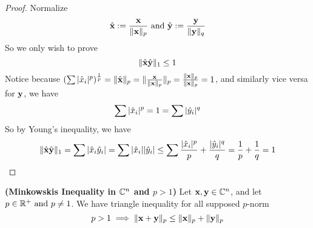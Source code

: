 \documentclass{report}
\begin{document}
\begin{proof}
Normalize 
\begin{equation}
\hat{\textbf{x}}:= \frac{\textbf{x}}{\| \textbf{x} \|_p}\text{ and }\hat{\textbf{y}}:=\frac{\textbf{y}}{\| \textbf{y} \|_q}
\end{equation}
So we only wish to prove
\begin{equation}
\| \hat{\textbf{x}}\hat{\textbf{y}} \|_1\leq 1 
\end{equation}
Notice because $(\sum |\hat{x}_i|^p)^{\frac{1}{p}}=\| \hat{\textbf{x}} \|_p=\| \frac{\textbf{x}}{\| \textbf{x} \|_p} \|_p=\frac{\| \textbf{x} \|_p}{\| \textbf{x} \|_p}=1$, and similarly vice versa for $\textbf{y}$, we have \begin{equation}
\sum |\hat{x}_i|^p=1=\sum |\hat{y}_i|^q \end{equation} So by Young's inequality, we have \begin{equation} \| \hat{\textbf{x}}\hat{\textbf{y}} \|_1= \sum |\hat{x }_i\hat{y}_i|=\sum |\hat{x}_i||\hat{y}_i|\leq \sum \frac{|\hat{x}_i|^p}{p}+\frac{|\hat{y}_i|^q}{q}=\frac{1}{p}+\frac{1}{q}=1
\end{equation}
\end{proof}
\begin{corollary}
\label{4.1.4}
\textbf{(Minkowskis Inequality in $\mathbb{C}^n$ and $p>1$)} Let $\textbf{x},\textbf{y}\in\mathbb{C}^n$, and let $p\in \mathbb{R}^+\text{ and }p\neq 1$. We have triangle inequality for all supposed $p$-norm
\begin{equation}
p>1\implies  \| \textbf{x}+\textbf{y} \|_p\leq \| \textbf{x} \|_p+\| \textbf{y} \|_p
\end{equation}
\end{corollary}
\end{document}
